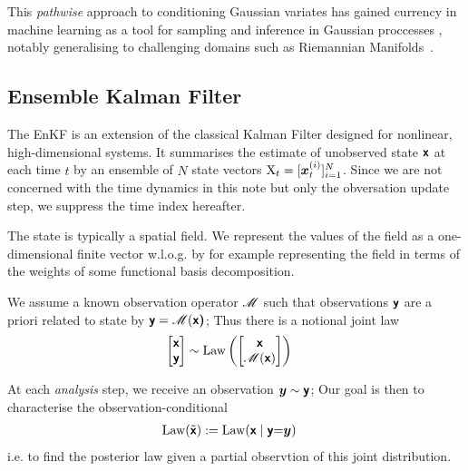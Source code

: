 \documentclass{article}
\begin{document}
This \emph{pathwise} approach to conditioning Gaussian variates has gained currency in machine learning as a tool for sampling and inference in Gaussian proccesses \citep{Wilson2020Efficiently,Wilson2021Pathwise}, notably generalising to challenging domains such as Riemannian Manifolds~\citep{Borovitskiy2020Matern}.

\subsection{Ensemble Kalman Filter}

The EnKF is an extension of the classical Kalman Filter designed for nonlinear, high-dimensional systems.
It summarises the estimate of unobserved state $\boldsymbol{\mathsf{x}}$ at each time $t$ by an ensemble of $N$ state vectors $\mathrm{X}_t=[\boldsymbol{x}_{t}^{(i)}]_{i=1}^N$.
Since we are not concerned with the time dynamics in this note but only the obversation update step, we suppress the time index hereafter.

The state is typically a spatial field. We represent the values of the field as a one-dimensional finite vector w.l.o.g. by for example representing the field in terms of the weights of some functional basis decomposition.

We assume a known observation operator $\mathscr{M}$ such that observations $\boldsymbol{\mathsf{y}}$ are a priori related to state by $\boldsymbol{\mathsf{y}}=\mathscr{M}(\boldsymbol{\mathsf{x}}\boldsymbol{\mathsf{)}}$; Thus there is a notional joint law
\begin{align}
    \begin{bmatrix}
        \boldsymbol{\mathsf{x}}\\
        \boldsymbol{\mathsf{y}}
    \end{bmatrix} &\sim\operatorname{Law} \left( \begin{bmatrix}
        \boldsymbol{\mathsf{x}}\\
        \mathscr{M}(\boldsymbol{\mathsf{x}})
    \end{bmatrix}\right)
\end{align}

At each \emph{analysis} step, we receive an observation $\boldsymbol{y}\sim\boldsymbol{\mathsf{y}}$;
Our goal is then to characterise the observation-conditional
\begin{align}
    \operatorname{Law}(\tilde{\boldsymbol{\mathsf{x}}})&:=\operatorname{Law}(\boldsymbol{\mathsf{x}}\mid \boldsymbol{\mathsf{y}}{=}\boldsymbol{y})
\end{align}
i.e. to find the posterior law given a partial observtion of this joint distribution.
\end{document}
